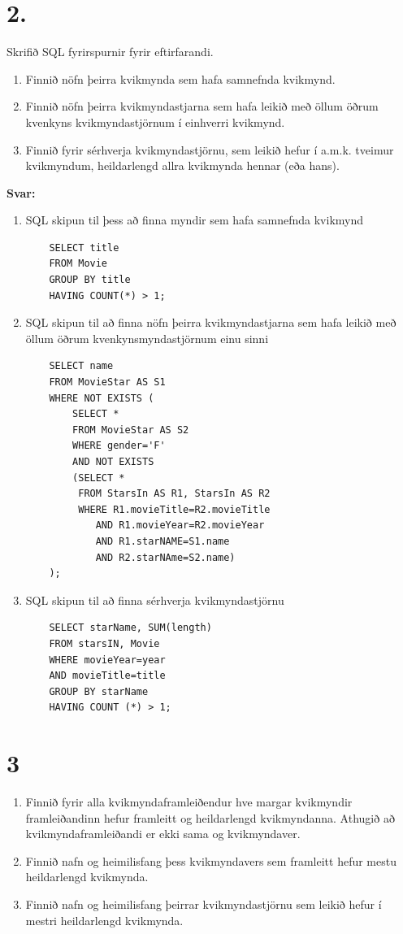 \documentclass{article}
\newcommand{\sv}{\textbf{Svar:}}
\newcommand{\enum}{\begin{enumerate}[label = \alph*.]}
\begin{document}
\newpage

\section{2.}
Skrifið SQL fyrirspurnir fyrir eftirfarandi.

\enum
\item Finnið nöfn þeirra kvikmynda sem hafa samnefnda kvikmynd.
\item Finnið nöfn þeirra kvikmyndastjarna sem hafa leikið með
öllum öðrum kvenkyns kvikmyndastjörnum í einhverri kvikmynd.
\item Finnið fyrir sérhverja kvikmyndastjörnu, sem leikið hefur í
a.m.k. tveimur kvikmyndum, heildarlengd allra kvikmynda hennar
(eða hans).
\end{enumerate}

\sv
\enum
\item SQL skipun til þess að finna myndir sem hafa samnefnda kvikmynd
\begin{verbatim}
    SELECT title 
    FROM Movie
    GROUP BY title
    HAVING COUNT(*) > 1;
\end{verbatim}
\item SQL skipun til að finna nöfn þeirra kvikmyndastjarna sem hafa leikið með öllum öðrum kvenkynsmyndastjörnum einu sinni
\begin{verbatim}
    SELECT name
    FROM MovieStar AS S1
    WHERE NOT EXISTS (
        SELECT *
        FROM MovieStar AS S2
        WHERE gender='F'
        AND NOT EXISTS
        (SELECT * 
         FROM StarsIn AS R1, StarsIn AS R2
         WHERE R1.movieTitle=R2.movieTitle
            AND R1.movieYear=R2.movieYear
            AND R1.starNAME=S1.name
            AND R2.starNAme=S2.name)
    );
\end{verbatim}
\item  SQL skipun til að finna sérhverja kvikmyndastjörnu 
\begin{verbatim}
    SELECT starName, SUM(length)
    FROM starsIN, Movie 
    WHERE movieYear=year
    AND movieTitle=title
    GROUP BY starName
    HAVING COUNT (*) > 1;
\end{verbatim}
\end{enumerate}


\newpage


\section{3}
\enum
\item Finnið fyrir alla kvikmyndaframleiðendur hve margar
kvikmyndir framleiðandinn hefur framleitt og heildarlengd 
kvikmyndanna. Athugið að kvikmyndaframleiðandi er ekki sama og
kvikmyndaver. 
\item Finnið nafn og heimilisfang þess kvikmyndavers sem framleitt
hefur mestu heildarlengd kvikmynda.
\item Finnið nafn og heimilisfang þeirrar kvikmyndastjörnu sem
leikið hefur í mestri heildarlengd kvikmynda.
\end{enumerate}
\end{document}

